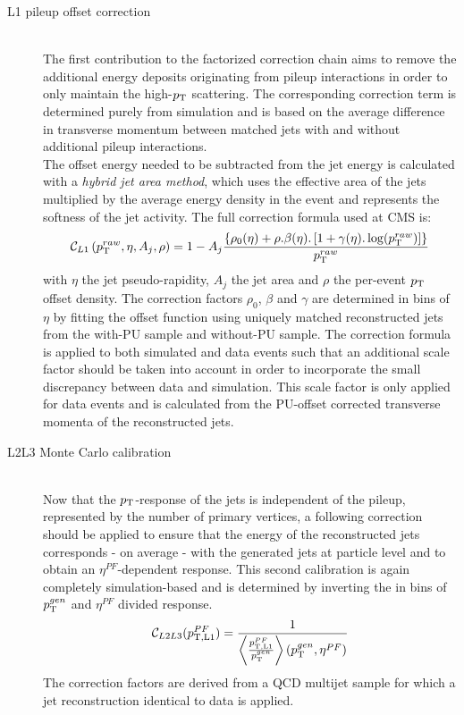 \begin{myindentpar}
  \begin{description}
    \item[L1 pileup offset correction] \hfill \\
    The first contribution to the factorized correction chain aims to remove the additional energy deposits originating from pileup interactions in order to only maintain the high-$p_{\rm T}$ scattering. The corresponding correction term is determined purely from simulation and is based on the average difference in transverse momentum between matched jets with and without additional pileup interactions.
    \\
    
    \indPar The offset energy needed to be subtracted from the jet energy is calculated with a \textit{hybrid jet area method}, which uses the effective area of the jets multiplied by the average energy density in the event and represents the softness of the jet activity. The full correction formula used at CMS is:    
    \begin{equation}
     \mathcal{C}_{L1}\left(p_{\rm T}^{raw}, \eta, A_{j}, \rho \right) = 1 - A_{j} \dfrac{\left\lbrace \rho_{0}(\eta) + \rho . \beta(\eta) . \left[ 1 + \gamma(\eta).\log(p_{\rm T}^{raw}) \right] \right\rbrace}{p_{\rm T}^{raw}}
    \end{equation}
    with $\eta$ the jet pseudo-rapidity, $A_{j}$ the jet area and $\rho$ the per-event $p_{\rm T}$ offset density. 
    The correction factors $\rho_{0}$, $\beta$ and $\gamma$ are determined in bins of $\eta$ by fitting the offset function using uniquely matched reconstructed jets from the with-PU sample and without-PU sample. 
    The correction formula is applied to both simulated and data events such that an additional scale factor should be taken into account in order to incorporate the small discrepancy between data and simulation.
    This scale factor is only applied for data events and is calculated from the PU-offset corrected transverse momenta of the reconstructed jets.
    
    \item[L2L3 Monte Carlo calibration] \hfill \\
    Now that the $p_{\rm T}$-response of the jets is independent of the pileup, represented by the number of primary vertices, a following correction should be applied to ensure that the energy of the reconstructed jets corresponds - on average - with the generated jets at particle level and to obtain an $\eta^{PF}$-dependent response. This second calibration is again completely simulation-based and is determined by inverting the in bins of $p_{\rm T}^{gen}$ and $\eta^{PF}$ divided response.
    \begin{equation}
     \mathcal{C}_{L2L3}(p_{\rm T, L1}^{PF}) = \dfrac{1}{\left\langle \frac{p_{\rm T, L1}^{PF}}{p_{\rm T}^{gen}} \right\rangle \left(p_{\rm T}^{gen}, \eta^{PF} \right)}
    \end{equation}
    The correction factors are derived from a QCD multijet sample for which a jet reconstruction identical to data is applied.
    

\end{description}
\end{myindentpar}
